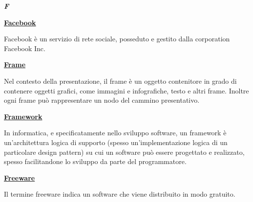 \newpage

\cleardoublepage
{}
{}
\noindent\hrulefill\hspace{4mm}\textbf{\textsl{\Huge{F}}}\hspace{4mm}\hrulefill
\vspace*{2\bigskipamount}

\begin{addmargin}[0em]{0em}		
	\textbf{\underline{Facebook}}
\end{addmargin}
	
\medskip
\begin{addmargin}[5em]{1em}	
Facebook è un servizio di rete sociale, posseduto e gestito dalla corporation Facebook Inc.
\end{addmargin}	

\bigskip
\begin{addmargin}[0em]{0em}
	\textbf{\underline{Frame}}
\end{addmargin}

\medskip
\begin{addmargin}[5em]{1em}	
Nel contesto della presentazione, il frame è un oggetto contenitore in grado di contenere oggetti grafici, come immagini e infografiche, testo e altri frame. Inoltre ogni frame può rappresentare un nodo del cammino presentativo.
\end{addmargin}	

\bigskip
\begin{addmargin}[0em]{0em}	
	\textbf{\underline{Framework}}
\end{addmargin}

\medskip
\begin{addmargin}[5em]{1em}	
In informatica, e specificatamente nello sviluppo software, un framework è un'architettura logica di supporto (spesso un'implementazione logica di un particolare design pattern) su cui un software può essere progettato e realizzato, spesso facilitandone lo sviluppo da parte del programmatore.
\end{addmargin}	

\bigskip
\begin{addmargin}[0em]{0em}	
	\textbf{\underline{Freeware}} 
\end{addmargin}

\medskip
\begin{addmargin}[5em]{1em}	
Il termine freeware indica un software che viene distribuito in modo gratuito.
\end{addmargin}	

\newpage

